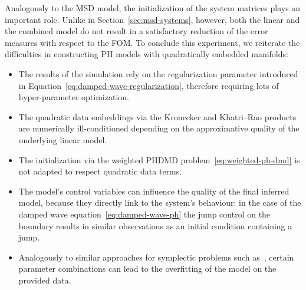 Analogously to the \ac{MSD} model, the initialization of the system matrices plays an important role.
Unlike in Section~\ref{sec:msd-systems}, however, both the linear and the combined model do not result in a satisfactory reduction of the error measures with respect to the \ac{FOM}.
To conclude this experiment, we reiterate the difficulties in constructing \ac{PH} models with quadratically embedded manifolds:
\begin{itemize}
    \item The results of the simulation rely on the regularization parameter introduced in Equation~\eqref{eq:damped-wave-regularization}, therefore requiring lots of hyper-parameter optimization.
    \item The quadratic data embeddings via the Kronecker and Khatri--Rao products are numerically ill-conditioned depending on the approximative quality of the underlying linear model.
    \item The initialization via the weighted \ac{PHDMD} problem~\eqref{eq:weighted-ph-dmd} is not adapted to respect quadratic data terms.
    \item The model's control variables can influence the quality of the final inferred model, because they directly link to the system's behaviour: in the case of the damped wave equation~\eqref{eq:damped-wave-ph} the jump control on the boundary results in similar observations as an initial condition containing a jump.
    \item Analogously to similar approaches for symplectic problems such as~\cite{Sharma2023}, certain parameter combinations can lead to the overfitting of the model on the provided data.
\end{itemize}
